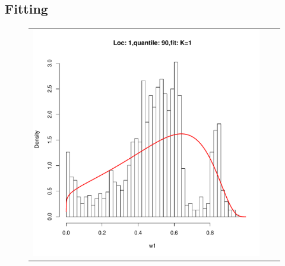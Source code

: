 \documentclass[10pt]{report}
\begin{document}
\subsection{Fitting}


\begin{figure}[h]
\begin{tabular}{ccc}
\includegraphics[width=\textwidth/3]{../img/loc1/quantile90/fit_K1.pdf}
&

\end{tabular}
\end{figure}
\end{document}
